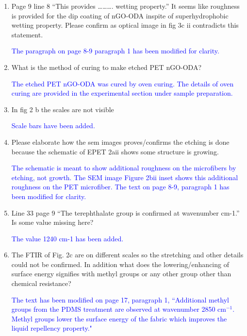 \documentclass[12pt]{letter}
\newcommand{\blue}[1]{\textcolor{blue}{#1}} %
\begin{document}
\begin{enumerate}

\item    Page 9 line 8 “This provides ………. wetting property.” It seems like roughness is provided for the dip coating of nGO-ODA inspite of superhydrophobic wetting property. Please confirm as optical image in fig 3c ii contradicts this statement.

\blue{The paragraph on page 8-9 paragraph 1 has been modified for clarity.}


\item   What is the method of curing to make etched PET nGO-ODA?

\blue{The etched PET nGO-ODA was cured by oven curing.  %
The details of oven curing are provided in the experimental section under sample preparation.}  %

\item     In fig 2 b the scales are not visible

\blue{Scale bars have been added.}


\item     Please elaborate how the sem images proves/confirms the etching is done because the schematic of EPET 2aii shows some structure is growing.

\blue{The schematic is meant to show additional roughness on the microfibers by etching, not growth. The SEM image Figure 2bii inset shows this additional roughness on the PET microfiber. The text on page 8-9, paragraph 1 has been modified for clarity. }

\item    Line 33 page 9 “The terephthalate group is confirmed at wavenumber cm-1.” Is some value missing here?

\blue{The value 1240 cm-1 has been added. }

\item     The FTIR  of Fig. 2c are on different scales so the stretching and other details could not be confirmed. In addition what does the lowering/enhancing of surface energy signifies with methyl groups or any other group other than chemical resistance?

\blue{The text has been modified on page 17, paragraph 1, ``Additional methyl groups from the PDMS treatment are observed at wavenumber 2850 cm$^{-1}$. Methyl groups lower the surface energy of the fabric which improves the liquid repellency property."}


\end{enumerate}
\end{document}
